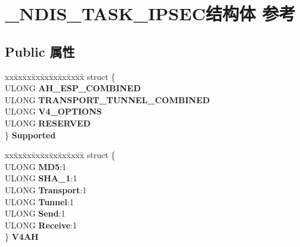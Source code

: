 \hypertarget{struct___n_d_i_s___t_a_s_k___i_p_s_e_c}{}\section{\+\_\+\+N\+D\+I\+S\+\_\+\+T\+A\+S\+K\+\_\+\+I\+P\+S\+E\+C结构体 参考}
\label{struct___n_d_i_s___t_a_s_k___i_p_s_e_c}
\subsection*{Public 属性}
\begin{DoxyCompactItemize}
\item 
\mbox{\label{struct___n_d_i_s___t_a_s_k___i_p_s_e_c_a496be4fa881114408c3fd7ea6f386d9c}} 
\begin{tabbing}
xx\=xx\=xx\=xx\=xx\=xx\=xx\=xx\=xx\=\kill
struct \{\\
\>ULONG {\bfseries AH\_ESP\_COMBINED}\\
\>ULONG {\bfseries TRANSPORT\_TUNNEL\_COMBINED}\\
\>ULONG {\bfseries V4\_OPTIONS}\\
\>ULONG {\bfseries RESERVED}\\
\} {\bfseries Supported}\\

\end{tabbing}\item 
\mbox{\label{struct___n_d_i_s___t_a_s_k___i_p_s_e_c_aa46cf5e8f4fa022ada577a7382bbe543}} 
\begin{tabbing}
xx\=xx\=xx\=xx\=xx\=xx\=xx\=xx\=xx\=\kill
struct \{\\
\>ULONG {\bfseries MD5}:1\\
\>ULONG {\bfseries SHA\_1}:1\\
\>ULONG {\bfseries Transport}:1\\
\>ULONG {\bfseries Tunnel}:1\\
\>ULONG {\bfseries Send}:1\\
\>ULONG {\bfseries Receive}:1\\
\} {\bfseries V4AH}\\


\end{tabbing}
\end{DoxyCompactItemize}
